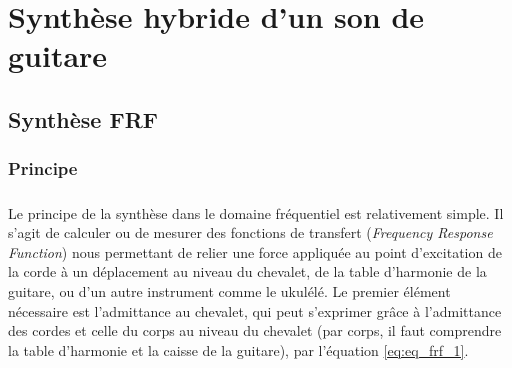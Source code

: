 % 
% 
% 
% 
% 
% 
% 
% 
% 
% 
% 

\chapter{Synthèse hybride d'un son de guitare}

\section{Synthèse FRF}

\subsection{Principe}
\paragraph*{} 

Le principe de la synthèse dans le domaine fréquentiel est relativement simple.
Il s'agit de calculer ou de mesurer des fonctions de transfert
(\textit{Frequency Response Function}) nous permettant de relier une force
appliquée au point d'excitation de la corde à un déplacement au niveau du
chevalet, de la table d'harmonie de la guitare, ou d'un autre instrument comme
le ukulélé. Le premier élément nécessaire est l'admittance au chevalet, qui
peut s'exprimer grâce à l'admittance des cordes et celle du corps au niveau du
chevalet (par corps, il faut comprendre la table d'harmonie et la caisse de la
guitare), par l'équation \ref{eq:eq_frf_1}.


